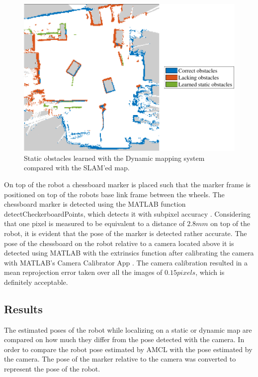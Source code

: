 \begin{figure}
    \centering
    \includegraphics[scale=1]{chapters/evaluation/figures/static_classified_localization_test-crop}
    \caption{Static obstacles learned with the Dynamic mapping system compared with the SLAM'ed map.}
    \label{fig:static_classified_localization_test-crop}
\end{figure}

On top of the robot a chessboard marker is placed such that the marker frame is positioned on top of the robots base link frame between the wheels.
The chessboard marker is detected using the MATLAB function detectCheckerboardPoints, which detects it with subpixel accuracy \cite{matlab_detect_checkerboard}.
Considering that one pixel is measured to be equivalent to a distance of $2.8mm$ on top of the robot, it is evident that the pose of the marker is detected rather accurate.
The pose of the chessboard on the robot relative to a camera located above it is detected using MATLAB with the extrinsics function \cite{matlab_extrinsics} after calibrating the camera with MATLAB's Camera Calibrator App  \cite{camera_calibrator_app}. 
The camera calibration resulted in a mean reprojection error taken over all the images of $0.15pixels$, which is definitely acceptable.

\subsection{Results}
The estimated poses of the robot while localizing on a static or dynamic map are compared on how much they differ from the pose detected with the camera.
In order to compare the robot pose estimated by AMCL with the pose estimated by the camera. The pose of the marker relative to the camera was converted to represent the pose of the robot.

